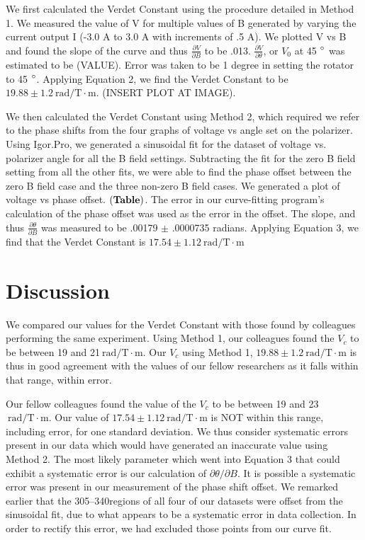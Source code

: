 \documentclass[prb,preprint]{revtex4-1}
\begin{document}
{{{We first calculated the Verdet Constant using the procedure detailed in Method 1.  We measured the value of V for multiple values of B generated by varying the current output I (-3.0 A to 3.0 A with increments of .5 A).  We plotted V vs B and found the slope of the curve and thus $\frac{\partial V}{\partial B}$ to be .013.  $\frac{\partial V}{\partial \theta}$, or $V_{0}$ at 45 $\degree$ was estimated to be (VALUE).  Error was taken to be 1 degree in setting the rotator to 45 $\degree$.  Applying Equation 2, we find the Verdet Constant to be $19.88 \pm 1.2 \mathrm{~rad/T} \cdot \textrm{m}$. (INSERT PLOT AT IMAGE).
{We then calculated the Verdet Constant using Method 2, which required we refer to the phase shifts from the four graphs of voltage vs angle set on the polarizer.  Using Igor.Pro, we generated a sinusoidal fit for the dataset of voltage vs. polarizer angle for all the B field settings.  Subtracting the fit for the zero B field setting from all the other fits, we were able to find the phase offset between the zero B field case and the three non-zero B field cases.  We generated a plot of voltage vs phase offset.  $\bf (Table)$.  The error in our curve-fitting program's calculation of the phase offset was used as the error in the offset.  The slope, and thus $\frac{\partial \theta}{\partial B}$ was measured to be .00179 $\pm$ .0000735 radians.  Applying Equation 3, we find that the Verdet Constant is $17.54 \pm 1.12 \mathrm{~rad/T} \cdot \textrm{m}$


\section{Discussion}

{We compared our values for the Verdet Constant with those found by colleagues performing the same experiment.  Using Method 1, our colleagues found the $V_{c}$ to be between 19 and 21$\mathrm{~rad/T} \cdot \textrm{m}$.  Our $V_{c}$ using Method 1, $19.88 \pm 1.2 \mathrm{~rad/T} \cdot \textrm{m}$ is thus in good agreement with the values of our fellow researchers as it falls within that range, within error.

{Our fellow colleagues found the value of the $V_{c}$ to be between 19 and 23 $\mathrm{~rad/T} \cdot \textrm{m}$.  Our value of $17.54 \pm 1.12 \mathrm{~rad/T} \cdot \textrm{m}$ is NOT within this range, including error, for one standard deviation.  We thus consider systematic errors present in our data which would have generated an inaccurate value using Method 2.  The most likely parameter which went into Equation 3 that could exhibit a systematic error is our calculation of $\partial \theta/\partial B$.  It is possible a systematic error was present in our measurement of the phase shift offset.  We remarked earlier that the 305\degree--340\degree regions of all four of our datasets were offset from the sinusoidal fit, due to what appears to be a systematic error in data collection.  In order to rectify this error, we had excluded those points from our curve fit. 

}}}}}}
\end{document}
